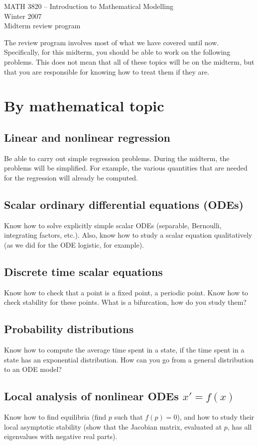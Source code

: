 \documentclass[12pt]{article}
\begin{document}
\begin{center}
\Large MATH 3820 -- Introduction to Mathematical Modelling\\
Winter 2007\\
Midterm review program
\end{center}
\vskip2cm
The review program involves most of what we have covered until now. Specifically, for this midterm, you should be able to work on the following problems. This does not mean that all of these topics will be on the midterm, but that you are responsible for knowing how to treat them if they are.

\section*{By mathematical topic}
\subsection*{Linear and nonlinear regression}
Be able to carry out simple regression problems. During the midterm, the problems will be simplified. For example, the various quantities that are needed for the regression will already be computed.

\subsection*{Scalar ordinary differential equations (ODEs)}
Know how to solve explicitly simple scalar ODEs (separable, Bernoulli, integrating factors, etc.). Also, know how to study a scalar equation qualitatively (as we did for the ODE logistic, for example).


\subsection*{Discrete time scalar equations}
Know how to check that a point is a fixed point, a periodic point. Know how to check stability for these points. What is a bifurcation, how do you study them?


\subsection*{Probability distributions}
Know how to compute the average time spent in a state, if the time spent in a state has an exponential distribution. How can you go from a general distribution to an ODE model?

\subsection*{Local analysis of nonlinear ODEs $x'=f(x)$}
Know how to find equilibria (find $p$ such that $f(p)=0$), and how to study their local asymptotic stability (show that the Jacobian matrix, evaluated at $p$, has all eigenvalues with negative real parts).
\end{document}
